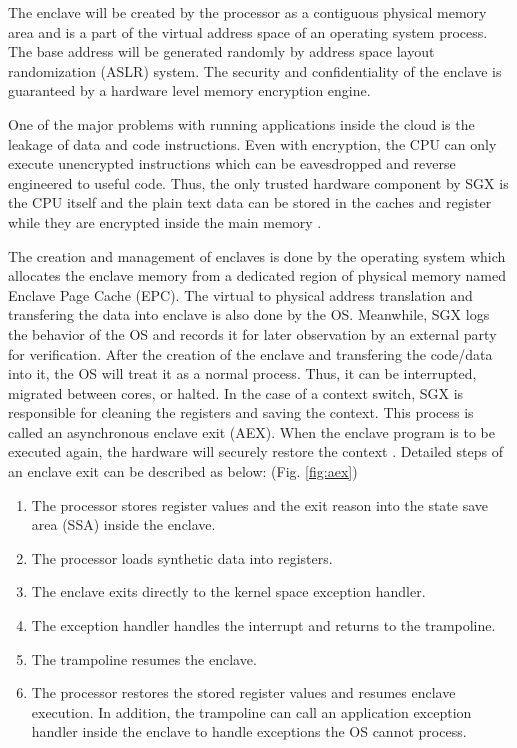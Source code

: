 The enclave will be created by the processor as a contiguous physical memory area and is a part of the virtual address space of an operating system process. The base address will be generated randomly by address space layout randomization (ASLR) system. The security and confidentiality of the enclave is guaranteed by a hardware level memory encryption engine.

One of the major problems with running applications inside the cloud is the leakage of data and code instructions. Even with encryption, the CPU can only execute unencrypted instructions which can be eavesdropped and reverse engineered to useful code. Thus, the only trusted hardware component by SGX is the CPU itself and the plain text data can be stored in the caches and register while they are encrypted inside the main memory \cite{brasser2017software}.

The creation and management of enclaves is done by the operating system which allocates the enclave memory from a dedicated region of physical memory named Enclave Page Cache (EPC). The virtual to physical address translation and transfering the data into enclave is also done by the OS. Meanwhile, SGX logs the behavior of the OS and records it for later observation by an external party for verification. After the creation of the enclave and transfering the code/data into it, the OS will treat it as a normal process. Thus, it can be interrupted, migrated between cores, or halted. In the case of a context switch, SGX is responsible for cleaning the registers and saving the context. This process is called an asynchronous enclave exit (AEX). When the enclave program is to be executed again, the hardware will securely restore the context \cite{brasser2017software}. Detailed steps of an enclave exit can be described as below: \cite{tsgx} (Fig. \ref{fig:aex})

\begin{enumerate}
	\item The processor stores register values and the exit reason into the state save area (SSA) inside the enclave.
	\item The processor loads synthetic data into registers.
	\item The enclave exits directly to the kernel space exception handler.
	\item The exception handler handles the interrupt and returns to the trampoline.
	\item The trampoline resumes the enclave.
	\item The processor restores the stored register values and resumes enclave execution. In addition, the trampoline can call an application exception handler inside the enclave to handle exceptions the OS cannot process.
\end{enumerate}

